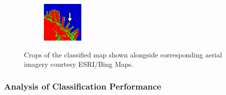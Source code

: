 \begin{figure}[tbp]
\begin{subfigure}[t]{0.19\textwidth}
\vspace{0.2cm}
\includegraphics[width=\columnwidth]{Figures/ALOS2_SF_3Class/Jetty}
\caption{}
\label{fig:cla2_f}
\end{subfigure} %
\caption{Crops of the classified map shown alongside corresponding aerial imagery courtesy ESRI/Bing Maps.}
\label{fig:cl_crop_alos2}
\end{figure}




\subsubsection{Analysis of Classification Performance}
\label{sec:EXPT2}





